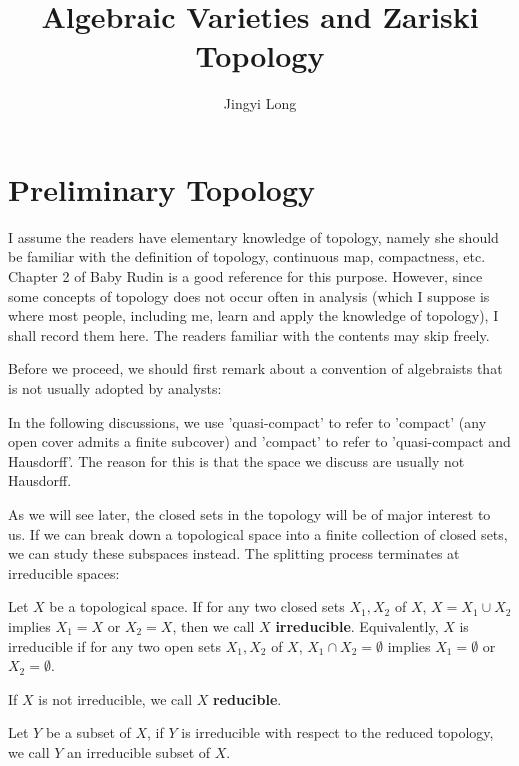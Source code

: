 \documentclass{note-eng}
\title{Algebraic Varieties and Zariski Topology}
\author{Jingyi Long}
\begin{document}
\maketitle
\tableofcontents

\newpage

\section{Preliminary Topology}

I assume the readers have elementary knowledge of topology, namely she should be familiar with the definition of topology, continuous map, compactness, etc. Chapter 2 of Baby Rudin is a good reference for this purpose. However, since some concepts of topology does not occur often in analysis (which I suppose is where most people, including me, learn and apply the knowledge of topology), I shall record them here. The readers familiar with the contents may skip freely.

Before we proceed, we should first remark about a convention of algebraists that is not usually adopted by analysts:

\begin{remark}
    In the following discussions, we use 'quasi-compact' to refer to 'compact' (any open cover admits a finite subcover) and 'compact' to refer to 'quasi-compact and Hausdorff'. The reason for this is that the space we discuss are usually not Hausdorff.
\end{remark}

As we will see later, the closed sets in the topology will be of major interest to us. If we can break down a topological space into a finite collection of closed sets, we can study these subspaces instead. The splitting process terminates at irreducible spaces:

\begin{definition}[Irreducible]
    Let $X$ be a topological space. If for any two closed sets $X_1, X_2$ of $X$, $X = X_1 \cup X_2$ implies $X_1 = X$ or $X_2 = X$, then we call $X$ \textbf{irreducible}. Equivalently, $X$ is irreducible if for any two open sets $X_1, X_2$ of $X$, $X_1 \cap X_2 = \emptyset$ implies $X_1 = \emptyset$ or $X_2 = \emptyset$.

    If $X$ is not irreducible, we call $X$ \textbf{reducible}.

    Let $Y$ be a subset of $X$, if $Y$ is irreducible with respect to the reduced topology, we call $Y$ an irreducible subset of $X$.
\end{definition}
\end{document}
